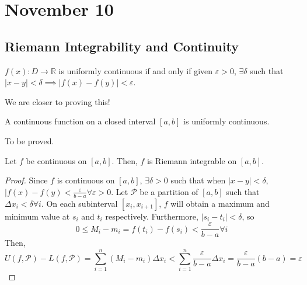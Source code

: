 \section{November 10}

\subsection{Riemann Integrability and Continuity}
\begin{definition}
    $f(x): D \to \mathbb{R}$ is uniformly continuous if and only if given $\varepsilon > 0$, $\exists \delta$ such that $|x - y| < \delta \implies |f(x) - f(y)| < \varepsilon$.
\end{definition}
\begin{remark}
    We are closer to proving this!
\end{remark}

\begin{theorem}
    A continuous function on a closed interval $[a, b]$ is uniformly continuous.
\end{theorem}
\begin{remark}
    To be proved.
\end{remark}

\begin{theorem}
    Let $f$ be continuous on $[a, b]$. Then, $f$ is Riemann integrable on $[a, b]$.
\end{theorem}
\begin{proof}
    Since $f$ is continuous on $[a, b]$, $\exists \delta > 0$ such that when $|x - y| < \delta$, $|f(x) - f(y) < \frac{\varepsilon}{b - a} \forall \varepsilon > 0$. Let $\mathcal{P}$ be a partition of $[a, b]$ such that $\Delta x_i < \delta \forall i$. On each subinterval $[x_i, x_{i + 1}]$, $f$ will obtain a maximum and minimum value at $s_i$ and $t_i$ respectively. Furthermore, $|s_i - t_i| < \delta$, so $$0 \leq M_i - m_i = f(t_i) - f(s_i) < \frac{\varepsilon}{b - a} \forall i$$ Then, $$U(f, \mathcal{P}) - L(f, \mathcal{P}) = \sum_{i = 1}^n (M_i - m_i) \Delta x_i < \sum_{i = 1}^n \frac{\varepsilon}{b - a} \Delta x_i = \frac{\varepsilon}{b - a} (b - a) = \varepsilon$$
\end{proof}

